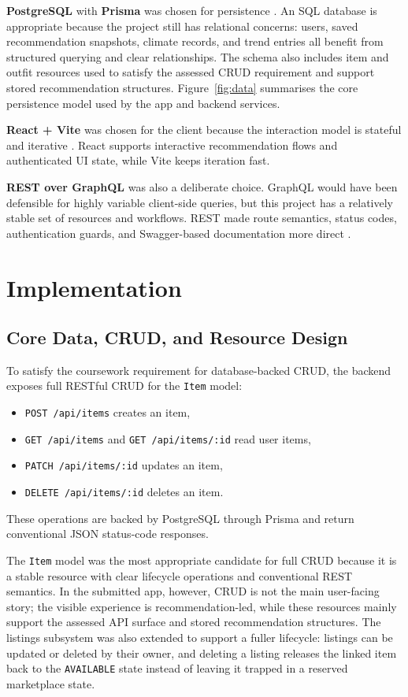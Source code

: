 \documentclass[11pt,a4paper]{article}
\begin{document}
\textbf{PostgreSQL} with \textbf{Prisma} was chosen for persistence \cite{postgresql,prisma}. An SQL database is appropriate because the project still has relational concerns: users, saved recommendation snapshots, climate records, and trend entries all benefit from structured querying and clear relationships. The schema also includes item and outfit resources used to satisfy the assessed CRUD requirement and support stored recommendation structures. Figure~\ref{fig:data} summarises the core persistence model used by the app and backend services.

\textbf{React + Vite} was chosen for the client because the interaction model is stateful and iterative \cite{react,vite}. React supports interactive recommendation flows and authenticated UI state, while Vite keeps iteration fast.

\textbf{REST over GraphQL} was also a deliberate choice. GraphQL would have been defensible for highly variable client-side queries, but this project has a relatively stable set of resources and workflows. REST made route semantics, status codes, authentication guards, and Swagger-based documentation more direct \cite{openapi}.

\section{Implementation}
\subsection{Core Data, CRUD, and Resource Design}
To satisfy the coursework requirement for database-backed CRUD, the backend exposes full RESTful CRUD for the \texttt{Item} model:
\begin{itemize}
  \item \texttt{POST /api/items} creates an item,
  \item \texttt{GET /api/items} and \texttt{GET /api/items/:id} read user items,
  \item \texttt{PATCH /api/items/:id} updates an item,
  \item \texttt{DELETE /api/items/:id} deletes an item.
\end{itemize}
These operations are backed by PostgreSQL through Prisma and return conventional JSON status-code responses.

The \texttt{Item} model was the most appropriate candidate for full CRUD because it is a stable resource with clear lifecycle operations and conventional REST semantics. In the submitted app, however, CRUD is not the main user-facing story; the visible experience is recommendation-led, while these resources mainly support the assessed API surface and stored recommendation structures. The listings subsystem was also extended to support a fuller lifecycle: listings can be updated or deleted by their owner, and deleting a listing releases the linked item back to the \texttt{AVAILABLE} state instead of leaving it trapped in a reserved marketplace state.
\end{document}
